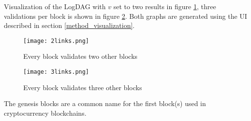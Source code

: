 Visualization of the LogDAG with $v$ set to two results in figure \ref{fig:2links},
three validations per block is shown in figure \ref{fig:3links}.
Both graphs are generated using the UI described in section \ref{method_visualization}.

\begin{figure}[H]
\centering \texttt{[image: 2links.png]}
\caption{ \label{fig:2links}
Every block validates two other blocks
}
\end{figure}

\begin{figure}[H]
\centering \texttt{[image: 3links.png]}
\caption{ \label{fig:3links}
Every block validates three other blocks
}
\end{figure}

The genesis blocks are a common name for the first block(s)
used in cryptocurrency blockchains.
